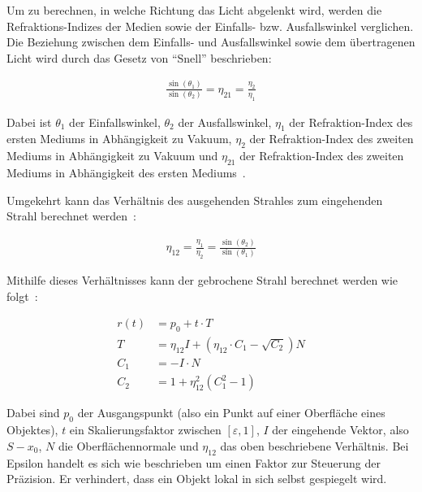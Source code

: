 Um zu berechnen, in welche Richtung das Licht abgelenkt wird, werden die
Refraktions-Indizes der Medien sowie der Einfalls- bzw. Ausfallswinkel
verglichen. Die Beziehung zwischen dem Einfalls- und Ausfallswinkel sowie dem
übertragenen Licht wird durch das Gesetz von ``Snell'' beschrieben:

\begin{gather}
    \frac{\sin(\theta_{1})}{\sin(\theta_{2})} = \eta_{21} = \frac{\eta_{2}}{\eta_{1}}
\end{gather}

Dabei ist $\theta_{1}$ der Einfallswinkel, $\theta_{2}$ der
Ausfallswinkel, $\eta_{1}$ der Refraktion-Index des ersten Mediums in
Abhängigkeit zu Vakuum, $\eta_{2}$ der Refraktion-Index des zweiten
Mediums in Abhängigkeit zu Vakuum und $\eta_{21}$ der Refraktion-Index
des zweiten Mediums in Abhängigkeit des ersten Mediums~\parencite[S. 134
bis 135]{glassner_introduction_1989}.

Umgekehrt kann das Verhältnis des ausgehenden Strahles zum eingehenden
Strahl berechnet werden~\parencite[S. 137 bis
140]{glassner_introduction_1989}:

\begin{gather}
    \eta_{12} = \frac{\eta_{1}}{\eta_{2}} = \frac{\sin(\theta_{2})}{\sin(\theta_{1})}
\end{gather}

Mithilfe dieses Verhältnisses kann der gebrochene Strahl berechnet
werden wie folgt~\parencite[S. 137 bis 140]{glassner_introduction_1989}:

\begin{align}
    r(t) &= p_{0} + t \cdot T \\
    T &= \eta_{12}I + (\eta_{12} \cdot C_{1} - \sqrt{C_{2}})N
    \label{eq:ray_tracing:transm} \\
    C_{1} &= -I \cdot N \\
    C_{2} &= 1 + \eta_{12}^{2}(C_{1}^{2} - 1) \label{eq:ray_tracing:transm_c2}
\end{align}

Dabei sind $p_{0}$ der Ausgangspunkt (also ein Punkt auf einer Oberfläche
eines Objektes), $t$ ein Skalierungsfaktor zwischen $[\varepsilon, 1]$, $I$
der eingehende Vektor, also $S - x_{0}$, $N$ die Oberflächennormale und
$\eta_{12}$ das oben beschriebene Verhältnis.
Bei Epsilon handelt es sich wie beschrieben um einen Faktor zur Steuerung
der Präzision. Er verhindert, dass ein Objekt lokal in sich selbst
gespiegelt wird.

